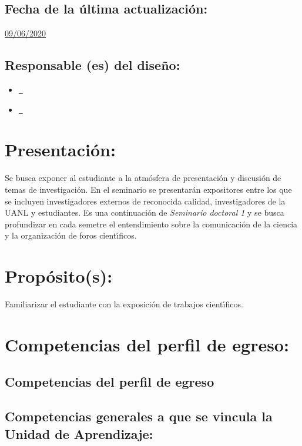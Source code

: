 \documentclass[10 pt]{article}
\begin{document}
\subsection{Fecha de la \'{u}ltima actualizaci\'{o}n:} \underline{09/06/2020}
\subsection{Responsable (es) del dise\~{n}o:}
\begin{itemize}[label={}]
\item \underline{\ncesar~\cesar}
\item \underline{\nelisa~\elisa}
\end{itemize}
\newpage
\section{Presentaci\'{o}n:}

Se busca exponer al estudiante a la atm\'{o}sfera de presentaci\'{o}n y
discusi\'{o}n de temas de investigaci\'{o}n. En el seminario se presentar\'{a}n
expositores entre los que se incluyen investigadores externos de
reconocida calidad, investigadores de la UANL y estudiantes. Es una
continuaci\'{o}n de {\em Seminario doctoral 1} y se busca profundizar en
cada semetre el entendimiento sobre la comunicaci\'{o}n de la ciencia y la
organizaci\'{o}n de foros cient\'{\i}ficos.


\section{Prop\'{o}sito(s):}

Familiarizar el estudiante con la exposici\'{o}n de trabajos cient\'{\i}ficos.


\section{Competencias del perfil de egreso:}
\subsection{Competencias del perfil de egreso}






  
\subsection{Competencias generales a que se vincula la Unidad de
    Aprendizaje:}
\end{document}
